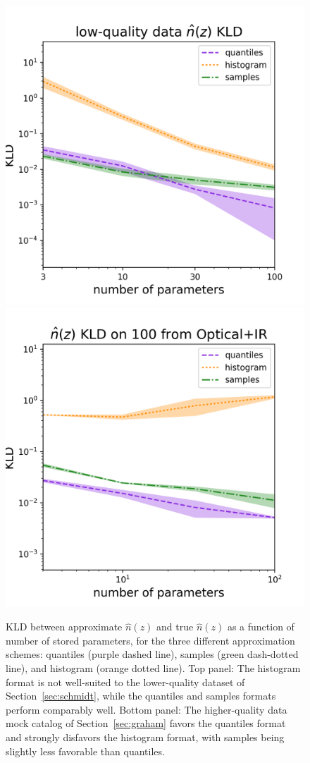 \documentclass[\docopts]{\docclass}
\begin{document}
\begin{figure}
  \includegraphics[width=0.9\columnwidth]{figures/schmidt_kld.png}\\
  \includegraphics[width=0.9\columnwidth]{figures/graham_kld.png}
  \caption{KLD between approximate $\hat{n}(z)$ and true $\hat{n}(z)$ as a 
function of number of stored parameters, for the three different approximation 
schemes: quantiles (purple dashed line), samples (green dash-dotted line), and 
histogram (orange dotted line).  Top panel: The histogram format is not 
well-suited to the lower-quality dataset of Section~\ref{sec:schmidt}, while 
the quantiles and samples formats perform comparably well.  Bottom panel: The 
higher-quality data mock catalog of Section~\ref{sec:graham} favors the 
quantiles format and strongly disfavors the histogram format, with samples 
being slightly less favorable than quantiles.
  \label{fig:kld}}
\end{figure}
\end{document}
